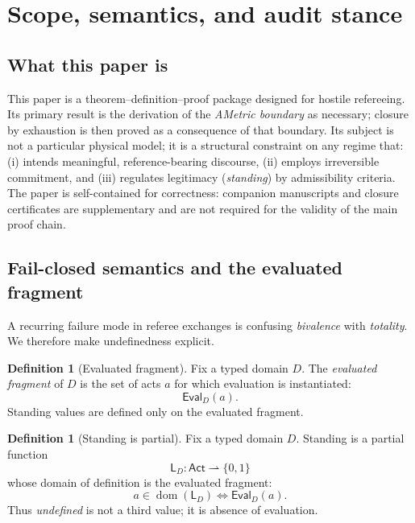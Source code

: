 \documentclass[11pt]{article}
\theoremstyle{definition}
\newtheorem{definition}[theorem]{Definition}
\newcommand{\Act}{\mathsf{Act}}
\newcommand{\Eval}{\mathsf{Eval}}
\newcommand{\Stand}{\mathsf{L}}
\newcommand{\pdom}{\operatorname{dom}}
\newcommand{\ppar}{\rightharpoonup} %
\begin{document}
\begin{abstract}
All claims are internal to the typed-domain framework: the paper introduces no empirical predictions.
\end{abstract}

\tableofcontents

\section{Scope, semantics, and audit stance}

\subsection{What this paper is}
This paper is a theorem--definition--proof package designed for hostile refereeing.
Its primary result is the derivation of the \emph{AMetric boundary} as necessary; closure by exhaustion is then proved as a consequence of that boundary.
Its subject is not a particular physical model; it is a structural constraint on any regime that:
(i) intends meaningful, reference-bearing discourse, (ii) employs irreversible commitment, and (iii) regulates legitimacy (\emph{standing}) by admissibility criteria.
The paper is self-contained for correctness: companion manuscripts and closure certificates are supplementary and are not required for the validity of the main proof chain.

\subsection{Fail-closed semantics and the evaluated fragment}
A recurring failure mode in referee exchanges is confusing \emph{bivalence} with \emph{totality}.
We therefore make undefinedness explicit.

\begin{definition}[Evaluated fragment]
Fix a typed domain $D$. The \emph{evaluated fragment} of $D$ is the set of acts $a$ for which evaluation is instantiated:
\[ \Eval_D(a). \]
Standing values are defined only on the evaluated fragment.
\end{definition}

\begin{definition}[Standing is partial]
Fix a typed domain $D$.
Standing is a partial function
\[ \Stand_D : \Act \ppar \{0,1\} \]
whose domain of definition is the evaluated fragment:
\[ a \in \pdom(\Stand_D) \iff \Eval_D(a). \]
Thus \emph{undefined} is not a third value; it is absence of evaluation.
\end{definition}
\end{document}
